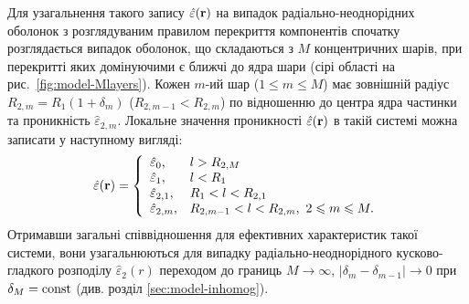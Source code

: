 \documentclass[14pt,twoside]{vakthesis}
\begin{document}
Для узагальнення такого запису $\hat{\varepsilon} ({\bf r})$ на випадок радіально-неоднорідних оболонок з розглядуваним правилом перекриття компонентів спочатку розглядається випадок оболонок, що складаються з  $M$ концентричних шарів, при перекритті яких домінуючими є ближчі до ядра шари (сірі області на рис.~\ref{fig:model-Mlayers}).
Кожен $m$-ий шар ($1 \leq m \leq M$) має зовнішній радіус $R_{2,m} = R_1(1 + \delta_m)$ ($R_{2,m-1}<R_{2,m}$) по відношенню до центра ядра частинки  та проникність $\hat{\varepsilon}_{2,m}$. Локальне значення проникності $\hat{\varepsilon} ({\bf r})$ в такій системі можна записати у наступному вигляді:
\begin{equation}\label{eq:local-perm-Mlayer}
\hat{\varepsilon} ({\bf r}) = \left\{ 
\begin{array}{ll}
\hat{\varepsilon}_0, & l > R_{2,M}\\
\hat{\varepsilon}_1, & l < R_1\\
\hat{\varepsilon}_{2,1}, & R_1 < l < R_{2,1}\\
\hat{\varepsilon}_{2,m}, & R_{2,m-1} < l < R_{2,m},\,\, 2 \leq m \leq M.
\end{array}
\right.
\end{equation}
Отримавши загальні співвідношення для ефективних характеристик такої системи, вони узагальнюються для випадку радіально-неоднорідного кусково-гладкого розподілу $\hat{\varepsilon}_2(r)$ переходом до границь $M \to \infty$, $|\delta_{m} - \delta_{m-1}| \to 0$ при $\delta_M = {\rm const}$ (див. розділ \ref{sec:model-inhomog}).

\end{document}
